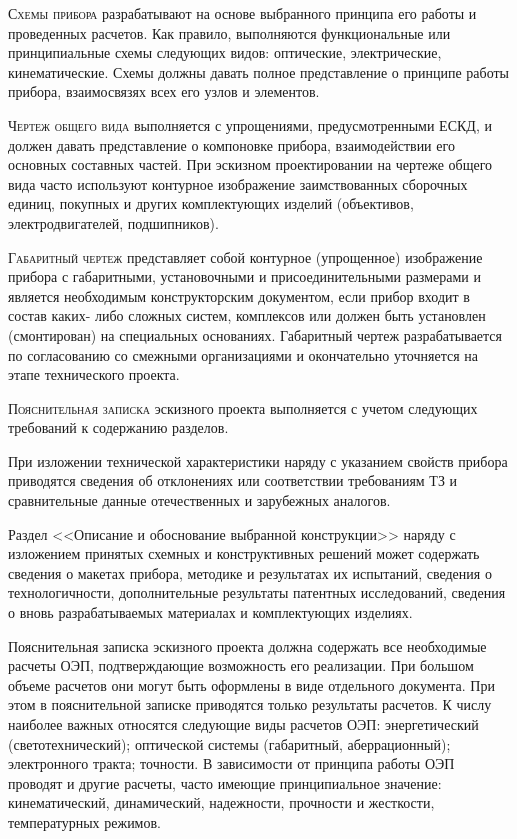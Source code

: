 \textsc{Схемы прибора} разрабатывают на основе выбранного принципа его работы и проведенных расчетов. 
Как правило, выполняются функциональные или принципиальные схемы следующих видов: оптические, электрические, кинематические. 
Схемы должны давать полное представление о принципе работы прибора, взаимосвязях всех его узлов и элементов.

\textsc{Чертеж общего вида} выполняется с упрощениями, предусмотренными ЕСКД, и должен давать представление о компоновке прибора, взаимодействии его основных составных частей. 
При эскизном проектировании на чертеже общего вида часто используют контурное изображение заимствованных сборочных единиц, покупных и других комплектующих изделий (объективов, электродвигателей, подшипников).

\textsc{Габаритный чертеж} представляет собой контурное (упрощенное) изображение прибора с габаритными, установочными и присоединительными размерами и является необходимым конструкторским документом, если прибор входит в состав каких- либо сложных систем, комплексов или должен быть установлен (смонтирован) на специальных основаниях. 
Габаритный чертеж разрабатывается по согласованию со смежными организациями и окончательно уточняется на этапе технического проекта.

\textsc{Пояснительная записка} эскизного проекта выполняется с учетом следующих требований к содержанию разделов.

При изложении технической характеристики наряду с указанием свойств прибора приводятся сведения об отклонениях или соответствии требованиям ТЗ и сравнительные данные отечественных и зарубежных аналогов.

Раздел <<Описание и обоснование выбранной конструкции>> наряду с изложением принятых схемных и конструктивных решений может содержать сведения о макетах прибора, методике и результатах их испытаний, сведения о технологичности, дополнительные результаты патентных исследований, сведения о вновь разрабатываемых материалах и комплектующих изделиях.

Пояснительная записка эскизного проекта должна содержать все необходимые расчеты ОЭП, подтверждающие возможность его реализации. При большом объеме расчетов они могут быть оформлены в виде отдельного документа. При этом в пояснительной записке приводятся только результаты расчетов.
К числу наиболее важных относятся следующие виды расчетов ОЭП: энергетический (светотехнический); оптической системы (габаритный, аберрационный); электронного тракта; точности. В зависимости от принципа работы ОЭП проводят и другие расчеты, часто имеющие принципиальное значение: кинематический, динамический, надежности, прочности и жесткости, температурных режимов.

